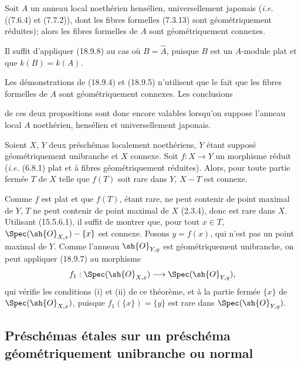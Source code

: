 \begin{corollary}[18.9.9]
\label{IV.18.9.9}
Soit $A$ un anneau local noethérien hensélien, universellement japonais (\emph{i.e.} ((7.6.4) et (7.7.2)), dont les fibres formelles (7.3.13) sont géométriquement réduites); alors les fibres formelles de $A$ sont géométriquement connexes.
\end{corollary}

Il suffit d'appliquer (18.9.8) au cas où $B=\widehat A$, puisque $B$ est un $A$-module plat et que $k(B)=k(A)$.

\begin{remark}[18.9.10]
\label{IV.18.9.10}
Les démonstrations de (18.9.4) et (18.9.5) n'utilisent que le fait que les fibres formelles de $A$ sont géométriquement connexes. Les conclusions


de ces deux propositions sont donc encore valables lorsqu'on suppose l'anneau local $A$ noethérien, hensélien et universellement japonais.
\end{remark}

\begin{corollary}[18.9.11]
\label{IV.18.9.11}
Soient $X$, $Y$ deux préschémas localement noethériens, $Y$ étant supposé géométriquement unibranche et $X$ connexe. Soit $f:X\to Y$ un morphisme réduit (\emph{i.e.} (6.8.1) plat et à fibres géométriquement réduites). Alors, pour toute partie fermée $T$ de $X$ telle que $f(T)$ soit rare dans $Y$, $X-T$ est connexe.
\end{corollary}

Comme $f$ est plat et que $f(T)$, étant rare, ne peut contenir de point maximal de $Y$, $T$ ne peut contenir de point maximal de $X$ (2.3.4), donc est rare dans $X$. Utilisant (15.5.6.1), il suffit de montrer que, pour tout $x\in T$, $\Spec(\sh{O}_{X,x})-\{x\}$ est connexe. Posons $y=f(x)$, qui n'est pas un point maximal de $Y$. Comme l'anneau $\sh{O}_{Y,y}$ est géométriquement unibranche, on peut appliquer (18.9.7) au morphisme
\[
  f_1:\Spec(\sh{O}_{X,x})\longrightarrow\Spec(\sh{O}_{Y,y}),
\]
qui vérifie les conditions (i) et (ii) de ce théorème, et à la partie fermée $\{x\}$ de $\Spec(\sh{O}_{X,x})$, puisque $f_1(\{x\})=\{y\}$ est rare dans $\Spec(\sh{O}_{Y,y})$.

\subsection{Préschémas étales sur un préschéma géométriquement unibranche ou normal}
\label{subsection:IV.18.10}

